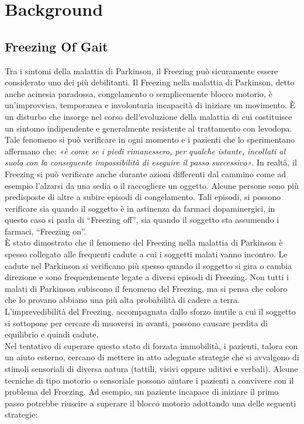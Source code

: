 

\chapter{Background}\label{chap3:background}
\section{Freezing Of Gait}
Tra i sintomi della malattia di Parkinson, il Freezing può sicuramente essere considerato uno dei più debilitanti. Il Freezing nella malattia di Parkinson, detto anche acinesia paradossa, congelamento o semplicemente blocco motorio, è un’improvvisa, temporanea e involontaria incapacità di iniziare un movimento. È un disturbo che insorge nel corso dell’evoluzione della malattia di cui costituisce un sintomo indipendente e generalmente resistente al trattamento con levodopa. Tale fenomeno si può verificare in ogni momento e i pazienti che lo sperimentano affermano che: \textit{«è come se i piedi rimanessero, per qualche istante, incollati al suolo con la conseguente impossibilità di eseguire il passo successivo»}. In realtà, il Freezing si può verificare anche durante azioni differenti dal cammino come ad esempio l’alzarsi da una sedia o il raccogliere un oggetto. Alcune persone sono più predisposte di altre a subire episodi di congelamento. Tali episodi, si possono verificare sia quando il soggetto è in astinenza da farmaci dopaminergici, in questo caso si parla di “Freezing off”, sia quando il soggetto sta assumendo i farmaci, “Freezing on”. \\
È stato dimostrato che il fenomeno del Freezing nella malattia di Parkinson è spesso collegato alle frequenti cadute a cui i soggetti malati vanno incontro. Le cadute nel Parkinson si verificano più spesso quando il soggetto si gira o cambia direzione e sono frequentemente legate a diversi episodi di Freezing. Non tutti i malati di Parkinson subiscono il fenomeno del Freezing, ma si pensa che coloro che lo provano abbiano una più alta probabilità di cadere a terra. L’imprevedibilità del Freezing, accompagnata dallo sforzo inutile a cui il soggetto si sottopone per cercare di muoversi in avanti, possono causare perdita di equilibrio e quindi cadute. \\
Nel tentativo di superare questo stato di forzata immobilità, i pazienti, talora con un aiuto esterno, cercano di mettere in atto adeguate strategie che si avvalgono di stimoli sensoriali di diversa natura (tattili, visivi oppure uditivi e verbali). Alcune tecniche di tipo motorio o sensoriale possono aiutare i pazienti a convivere con il problema del Freezing. Ad esempio, un paziente incapace di iniziare il primo passo potrebbe riuscire a superare il blocco motorio adottando una delle seguenti strategie:
